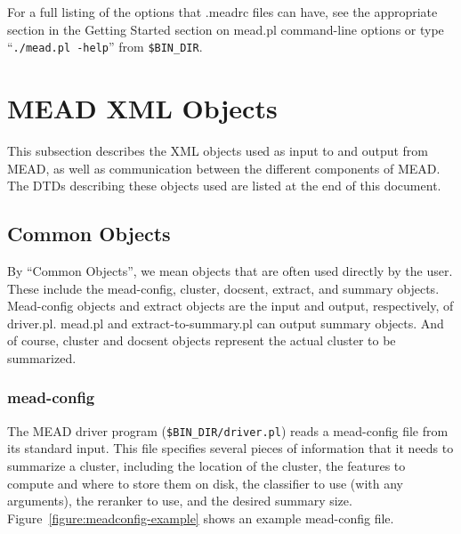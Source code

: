 \documentclass[10pt]{article}
\begin{document}
For a full listing of the options that .meadrc files can have, see
the appropriate section in the Getting Started section on 
mead.pl command-line options or type
``\verb|./mead.pl -help|'' from \verb|$BIN_DIR|.





\section{MEAD XML Objects}

This subsection describes the XML objects used as input to and output
from MEAD, as well as communication between the different components
of MEAD.  The DTDs describing these objects used are listed at the end
of this document.

\subsection{Common Objects}

By ``Common Objects'', we mean objects that are often used directly
by the user.  These include the mead-config, cluster, docsent, extract,
and summary objects.  Mead-config objects and extract objects are 
the input and output, respectively, of driver.pl.  mead.pl and
extract-to-summary.pl can output summary objects.  And of course,
cluster and docsent objects represent the actual cluster to be
summarized.

\subsubsection {mead-config}
\label{section:meadconfig}

The MEAD driver program (\verb|$BIN_DIR/driver.pl|) 
reads a mead-config file from its standard input.  This
file specifies several pieces of information that it
needs to summarize a cluster, including the location of
the cluster, the features to compute and where to store
them on disk, the classifier to use (with any arguments),
the reranker to use, and the desired summary size.
Figure~\ref{figure:meadconfig-example} shows an example
mead-config file.
\end{document}

